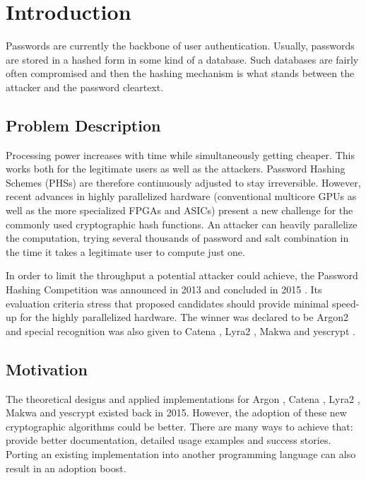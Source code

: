 \chapter{Introduction}
\label{sec:introduction}
Passwords are currently the backbone of user authentication. Usually, passwords are stored in a hashed form in some kind of a database. Such databases are fairly often compromised and then the hashing mechanism is what stands between the attacker and the password cleartext.

\section{Problem Description}
Processing power increases with time while simultaneously getting cheaper. This works both for the legitimate users as well as the attackers. Password Hashing Schemes (PHSs) are therefore continuously adjusted to stay irreversible. However, recent advances in highly parallelized hardware (conventional multicore GPUs as well as the more specialized FPGAs and ASICs) present a new challenge for the commonly used cryptographic hash functions. An attacker can heavily parallelize the computation, trying several thousands of password and salt combination in the time it takes a legitimate user to compute just one.

In order to limit the throughput a potential attacker could achieve, the Password Hashing Competition was announced in 2013 and concluded in 2015 \cite{wetzels:2016:phc}. Its evaluation criteria stress that proposed candidates should provide minimal speed-up for the highly parallelized hardware. The winner was declared to be Argon2 \cite{biryukov:2015:argon2} and special recognition was also given to Catena \cite{forler:2013:catena}, Lyra2 \cite{andrade:2016:lyra2,marcos:2015:lyra2}, Makwa \cite{pornin:2015:makwa} and yescrypt \cite{peslyak:2015:yescrypt}.

\section{Motivation}
The theoretical designs and applied implementations for Argon \cite{biryukov:2015:argon2}, Catena \cite{forler:2013:catena}, Lyra2 \cite{andrade:2016:lyra2,marcos:2015:lyra2}, Makwa \cite{pornin:2015:makwa} and yescrypt \cite{peslyak:2015:yescrypt} existed back in 2015. However, the adoption of these new cryptographic algorithms could be better. There are many ways to achieve that: provide better documentation, detailed usage examples and success stories. Porting an existing implementation into another programming language can also result in an adoption boost.

